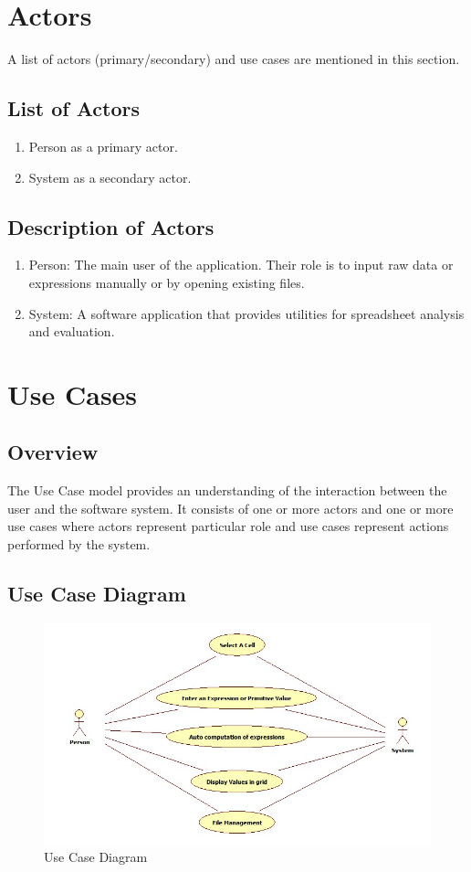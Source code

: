 \documentclass[12pt]{article}
\begin{document}
\section{Actors}
A list of actors (primary/secondary) and use cases are mentioned in this section.

\subsection{List of Actors}
\begin{enumerate}
\item Person as a primary actor.
\item System as a secondary actor.
\end{enumerate}

\subsection{Description of Actors}
\begin{enumerate}
\item Person:  The main user of the application. Their role is to input raw data or expressions manually or by opening existing files.
\item System:  A software application that provides utilities for spreadsheet analysis and evaluation.
\end{enumerate}

\section{Use Cases}

\subsection{Overview}
The Use Case model provides an understanding of the interaction between the user and the software
system. It consists of one or more actors and one or more use cases where actors represent particular
role and use cases represent actions performed by the system. 
\clearpage
\subsection{Use Case Diagram}
\begin{figure}[htbp]
\includegraphics[scale=0.7]{USE_CASE_DIAGRAM.jpg}
\caption{Use Case Diagram}
\label{fig:use-case-diagram}
\end{figure}
\end{document}

